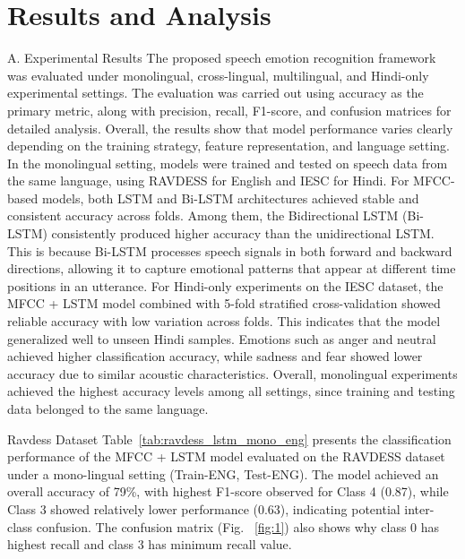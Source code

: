 \documentclass[runningheads]{llncs}
\begin{document}
\section{Results and Analysis}
A. Experimental Results
The proposed speech emotion recognition framework was evaluated under monolingual, cross-lingual, multilingual, and Hindi-only experimental settings. The evaluation was carried out using accuracy as the primary metric, along with precision, recall, F1-score, and confusion matrices for detailed analysis. Overall, the results show that model performance varies clearly depending on the training strategy, feature representation, and language setting.
\\
In the monolingual setting, models were trained and tested on speech data from the same language, using RAVDESS for English and IESC for Hindi. For MFCC-based models, both LSTM and Bi-LSTM architectures achieved stable and consistent accuracy across folds. Among them, the Bidirectional LSTM (Bi-LSTM) consistently produced higher accuracy than the unidirectional LSTM. This is because Bi-LSTM processes speech signals in both forward and backward directions, allowing it to capture emotional patterns that appear at different time positions in an utterance. For Hindi-only experiments on the IESC dataset, the MFCC + LSTM model combined with 5-fold stratified cross-validation showed reliable accuracy with low variation across folds. This indicates that the model generalized well to unseen Hindi samples. Emotions such as anger and neutral achieved higher classification accuracy, while sadness and fear showed lower accuracy due to similar acoustic characteristics. Overall, monolingual experiments achieved the highest accuracy levels among all settings, since training and testing data belonged to the same language.

Ravdess Dataset
Table~\ref{tab:ravdess_lstm_mono_eng} presents the classification performance of the MFCC + LSTM model evaluated on the RAVDESS dataset under a mono-lingual setting (Train-ENG, Test-ENG). The model achieved an overall accuracy of 79\%, with highest F1-score observed for Class 4 (0.87), while Class 3 showed relatively lower performance (0.63), indicating potential inter-class confusion. The confusion matrix (Fig. ~\ref{fig:1}) also shows why class 0 has highest recall and class 3 has minimum recall value.
\end{document}
